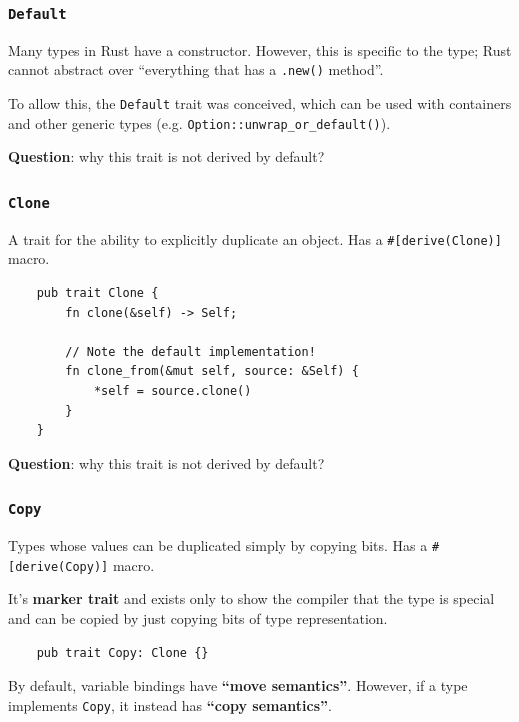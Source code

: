 \documentclass[aspectratio=1610,t]{beamer}
\begin{document}

\begin{frame}[fragile]
\frametitle{\texttt{Default}}
Many types in Rust have a constructor. However, this is specific to the type; Rust cannot abstract over  ``everything that has a \texttt{.new()} method''.

To allow this, the \texttt{Default} trait was conceived, which can be used with containers and other generic types (e.g. \texttt{Option::unwrap\_or\_default()}).

\textbf{Question}: why this trait is not derived by default?
\end{frame}


\begin{frame}[fragile]
\frametitle{\texttt{Clone}}
A trait for the ability to explicitly duplicate an object. Has a \texttt{\#[derive(Clone)]} macro.

\begin{verbatim}
    pub trait Clone {
        fn clone(&self) -> Self;

        // Note the default implementation!
        fn clone_from(&mut self, source: &Self) {
            *self = source.clone()
        }
    }
\end{verbatim}

\textbf{Question}: why this trait is not derived by default?
\end{frame}


\begin{frame}[fragile]
\frametitle{\texttt{Copy}}
Types whose values can be duplicated simply by copying bits. Has a \texttt{\#[derive(Copy)]} macro.

It's \textbf{marker trait} and exists only to show the compiler that the type is special and can be copied by just copying bits of type representation.

\begin{verbatim}
    pub trait Copy: Clone {}
\end{verbatim}

By default, variable bindings have \textbf{``move semantics''}. However, if a type implements \texttt{Copy}, it instead has \textbf{``copy semantics''}.
\end{frame}
\end{document}
